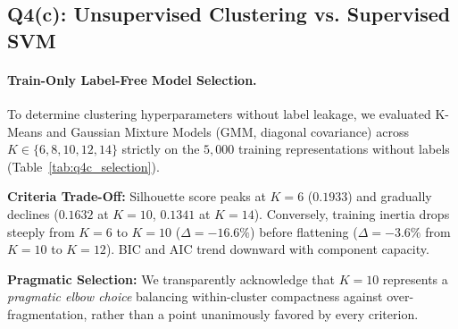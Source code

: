 \subsection{Q4(c): Unsupervised Clustering vs. Supervised SVM}
\paragraph{Train-Only Label-Free Model Selection.}
To determine clustering hyperparameters without label leakage, we evaluated K-Means and Gaussian Mixture Models (GMM, diagonal covariance) across $K \in \{6, 8, 10, 12, 14\}$ strictly on the $5{,}000$ training representations without labels (Table~\ref{tab:q4c_selection}).

\noindent\textbf{Criteria Trade-Off:} Silhouette score peaks at $K=6$ ($0.1933$) and gradually declines ($0.1632$ at $K=10$, $0.1341$ at $K=14$). Conversely, training inertia drops steeply from $K=6$ to $K=10$ ($\Delta = -16.6\%$) before flattening ($\Delta = -3.6\%$ from $K=10$ to $K=12$). BIC and AIC trend downward with component capacity.

\noindent\textbf{Pragmatic Selection:} We transparently acknowledge that $K=10$ represents a \textit{pragmatic elbow choice} balancing within-cluster compactness against over-fragmentation, rather than a point unanimously favored by every criterion.

